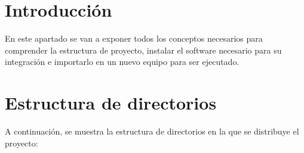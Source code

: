 \label{ape:dtp}

\section{Introducción}

En este apartado se van a exponer todos los conceptos necesarios para
comprender la estructura de proyecto, instalar el software necesario para su
integración e importarlo en un nuevo equipo para  ser ejecutado.


\section{Estructura de directorios}

A continuación, se muestra la estructura de directorios en la que se distribuye
el proyecto:
